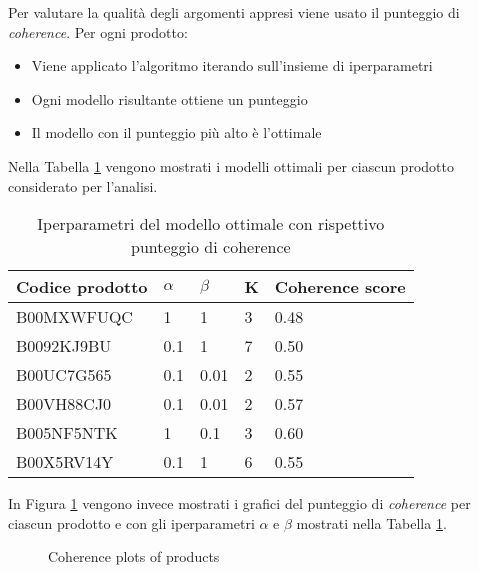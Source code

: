 Per valutare la qualità degli argomenti appresi viene usato il punteggio di \textit{coherence}. Per ogni prodotto:
\begin{itemize}
    \item Viene applicato l'algoritmo iterando sull'insieme di iperparametri
    \item Ogni modello risultante ottiene un punteggio
    \item Il modello con il punteggio più alto è l'ottimale
\end{itemize}{}

Nella Tabella \ref{hyper_opt} vengono mostrati i modelli ottimali per ciascun prodotto considerato per l'analisi. 

\begin{table}[H]
\small  
\centering
\begin{tabular}{|p{}|p{}|p{}|p{}||p{}|}
\hline
Codice prodotto & $\alpha$ & $\beta$ & K & Coherence score\\
\hline
B00MXWFUQC & 1 & 1 & 3 & 0.48 \\
B0092KJ9BU & 0.1 & 1 & 7 & 0.50 \\
B00UC7G565 & 0.1 & 0.01 & 2 & 0.55 \\
B00VH88CJ0 & 0.1 & 0.01 & 2 & 0.57 \\
B005NF5NTK & 1 & 0.1 & 3 & 0.60 \\
B00X5RV14Y & 0.1 & 1 & 6 & 0.55 \\
\hline
\end{tabular}
\caption{Iperparametri del modello ottimale con rispettivo punteggio di coherence}
\label{hyper_opt}
\end{table}

In Figura \ref{coherence_plots} vengono invece mostrati i grafici del punteggio di \textit{coherence} per ciascun prodotto e con gli iperparametri $\alpha$ e $\beta$ mostrati nella Tabella \ref{hyper_opt}. 

\begin{figure}[H]
    \centering
    \caption{Coherence plots of products}
    \label{coherence_plots}
\end{figure}


